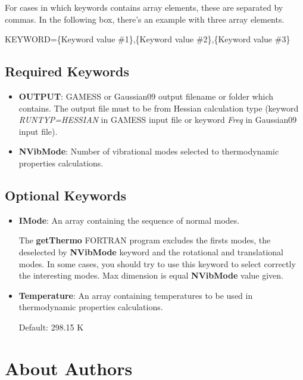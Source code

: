 \documentclass[11pt,oneside,a4paper]{article}
\begin{document}
For cases in which keywords contains array elements, these are separated by commas. In the following box, there's an example with three array elements.
\begin{shaded}
KEYWORD=\{Keyword value \#1\},\{Keyword value \#2\},\{Keyword value \#3\}
\end{shaded}

\subsection{Required Keywords}
\begin{itemize}
\item \textbf{OUTPUT}: GAMESS or Gaussian09 output filename or folder which contains. The output file must to be from Hessian calculation type (keyword \textit{RUNTYP=HESSIAN} in GAMESS input file or keyword \textit{Freq} in Gaussian09 input file).
\item \textbf{NVibMode}: Number of vibrational modes selected to thermodynamic properties calculations.
\end{itemize}

\subsection{Optional Keywords}
\begin{itemize}
\item \textbf{IMode}: An array containing the sequence of normal modes.

The \textbf{getThermo} FORTRAN program excludes	the firsts modes, the deselected by \textbf{NVibMode} keyword and the rotational and translational modes. In some cases, you should try to use this keyword to select correctly the interesting modes. Max dimension is equal \textbf{NVibMode} value given.

\item \textbf{Temperature}: An array containing temperatures to be used in thermodynamic properties calculations.

Default: 298.15 K
\end{itemize}

\pagebreak
\section[About Authors]{About Authors}
\end{document}

